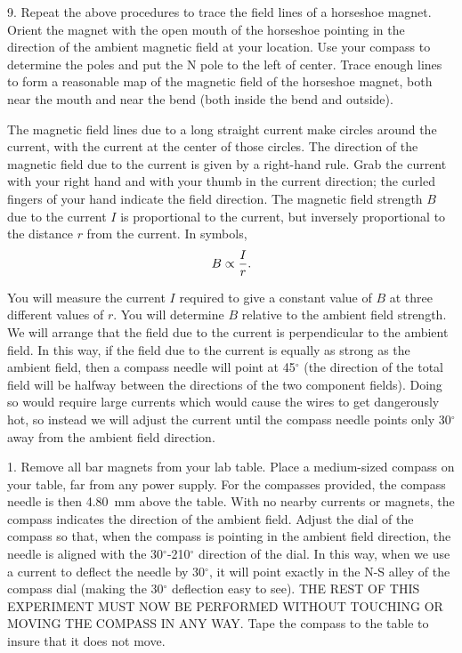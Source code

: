 \item{9.} Repeat the above procedures to trace the field
lines of a horseshoe magnet.  Orient the magnet with the
open mouth of the horseshoe pointing in the direction of
the ambient magnetic field at your location.  Use your
compass to determine the poles and put the N pole to the
left of center.  Trace enough lines to form a reasonable
map of the magnetic field of the horseshoe magnet, both
near the mouth and near the bend (both inside the bend
and outside).  

\vfil\eject
{}

The magnetic field lines due to a long straight current 
make circles around the current, with the current at the
center of those circles.   The direction of the magnetic
field due to the current is given by a right-hand rule.
Grab the current with your right hand and with your 
thumb in the current direction; the curled fingers of
your hand indicate the field direction.  The magnetic
field strength $B$ due to the current $I$ is proportional to
the current, but inversely proportional to the distance $r$
from the current.  In symbols,
$$B \propto {I\over r}.$$

You will measure the current $I$ required to give a constant
value of $B$ at three different values of $r$.  You will 
determine $B$ relative to the ambient field strength.  We 
will arrange that the field due to the current is perpendicular 
to the ambient field.  In this way, if the field due to the 
current is equally as strong as the ambient field, then a 
compass needle will point at 45$^\circ$ (the direction of the
total field will be halfway between the directions of the two
component fields).  Doing so would require large currents
which would cause the wires to get dangerously hot, so instead
we will adjust the current until the compass needle points only
30$^\circ$ away from the ambient field direction.  

\smallskip
{}

\item{1.} Remove all bar magnets from your lab table.
Place a medium-sized compass on your table, far from
any power supply.  For the compasses provided, the compass
needle is then 4.80~mm above the table.  With no nearby 
currents or magnets, the compass indicates the direction 
of the ambient field.  Adjust the dial of the compass so 
that, when the compass is pointing in the ambient field 
direction, the needle is aligned with the 
30$^\circ$-210$^\circ$ direction of the dial.  In this way, 
when we use a current to deflect the needle by 30$^\circ$, 
it will point exactly in the N-S alley of the compass dial 
(making the 30$^\circ$ deflection easy to see).  THE REST 
OF THIS EXPERIMENT MUST NOW BE PERFORMED WITHOUT TOUCHING 
OR MOVING THE COMPASS IN ANY WAY.  Tape the compass to the
table to insure that it does not move.

